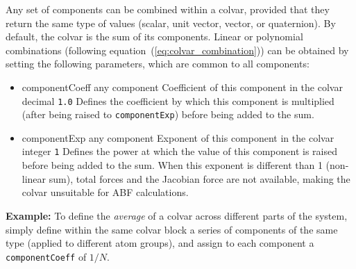 Any set of components can be combined within a colvar, provided that
they return the same type of values (scalar, unit vector, vector, or
quaternion).  By default, the colvar is the sum of its components.
Linear or polynomial combinations (following
equation~(\ref{eq:colvar_combination})) can be obtained by setting the
following parameters, which are common to all components:
\begin{itemize}
\item %
  \keydef
    {componentCoeff}{%
    any component}{%
    Coefficient of this component in the colvar}{%
    decimal}{%
    \texttt{1.0}}{%
    Defines the coefficient by which this component is multiplied
    (after being raised to \texttt{componentExp}) before being added
    to the sum.}

\item %
  \keydef
    {componentExp}{%
    any component}{%
    Exponent of this component in the colvar}{%
    integer}{%
    \texttt{1}}{%
    Defines the power at which the value of this component is raised
    before being added to the sum.  When this exponent is
    different than 1 (non-linear sum), total forces and the Jacobian
    force are not available, making the colvar unsuitable for ABF calculations.}
\end{itemize}

\textbf{Example:} To define the \emph{average} of a colvar across
different parts of the system, simply define within the same colvar
block a series of components of the same type (applied to different
atom groups), and assign to each component a \texttt{componentCoeff}
of $1/N$.


